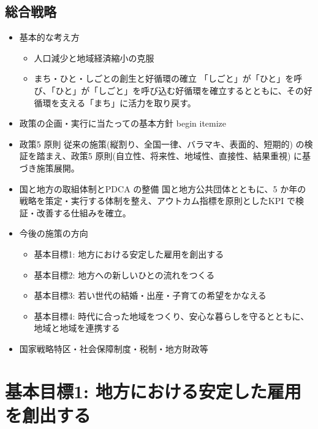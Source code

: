 \subsection {総合戦略}
\begin{figure}[htb]
  \begin{center}
  \end{center}
\end{figure}

\begin {itemize}
\item 基本的な考え方
  \begin {itemize}
  \item 人口減少と地域経済縮小の克服
  \item まち・ひと・しごとの創生と好循環の確立
    「しごと」が「ひと」を呼び、「ひと」が「しごと」を呼び込む好循環を確立するとともに、その好循環を支える「まち」に活力を取り戻す。
  \end {itemize}
\item 政策の企画・実行に当たっての基本方針
  begin {itemize}
\item 政策5 原則
  従来の施策(縦割り、全国一律、バラマキ、表面的、短期的) の検証を踏まえ、政策5 原則(自立性、将来性、地域性、直接性、結果重視) に基づき施策展開。
\item 国と地方の取組体制とPDCA の整備
  国と地方公共団体とともに、5 か年の戦略を策定・実行する体制を整え、アウトカム指標を原則としたKPI で検証・改善する仕組みを確立。
\end {itemize}

\begin {itemize}
\item 今後の施策の方向
  \begin {itemize}
  \item 基本目標1: 地方における安定した雇用を創出する
  \item 基本目標2: 地方への新しいひとの流れをつくる
  \item 基本目標3: 若い世代の結婚・出産・子育ての希望をかなえる
  \item 基本目標4: 時代に合った地域をつくり、安心な暮らしを守るとともに、地域と地域を連携する
  \end {itemize}
\item 国家戦略特区・社会保障制度・税制・地方財政等
\end {itemize}

\section {基本目標1: 地方における安定した雇用を創出する}
